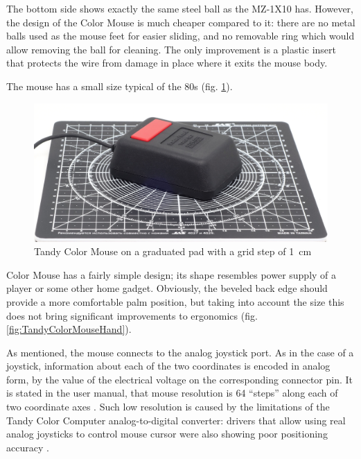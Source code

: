 \documentclass[11pt, a4paper]{article}
\begin{document}
The bottom side shows exactly the same steel ball as the MZ-1X10 has. However, the design of the Color Mouse is much cheaper compared to it: there are no metal balls used as the mouse feet for easier sliding, and no removable ring which would allow removing the ball for cleaning. The only improvement is a plastic insert that protects the wire from damage in place where it exits the mouse body.

The mouse has a small size typical of the 80s (fig. \ref{fig:TandyColorMouseSize}).

\begin{figure}[h]
    \centering
    \includegraphics[scale=0.49]{1984_tandy_trs80_color_mouse/size_30.jpg}
    \caption{Tandy Color Mouse on a graduated pad with a grid step of 1~cm}
    \label{fig:TandyColorMouseSize}
\end{figure}

Color Mouse has a fairly simple design; its shape resembles power supply of a player or some other home gadget. Obviously, the beveled back edge should provide a more comfortable palm position, but taking into account the size this does not bring significant improvements to ergonomics (fig. \ref{fig:TandyColorMouseHand}).

As mentioned, the mouse connects to the analog joystick port. As in the case of a joystick, information about each of the two coordinates is encoded in analog form, by the value of the electrical voltage on the corresponding connector pin. It is stated in the user manual, that mouse resolution is 64 ``steps'' along each of two coordinate axes \cite{manual}. Such low resolution is caused by the limitations of the Tandy Color Computer analog-to-digital converter: drivers that allow using real analog joysticks to control mouse cursor were also showing poor positioning accuracy \cite{hierophant}.
\end{document}
